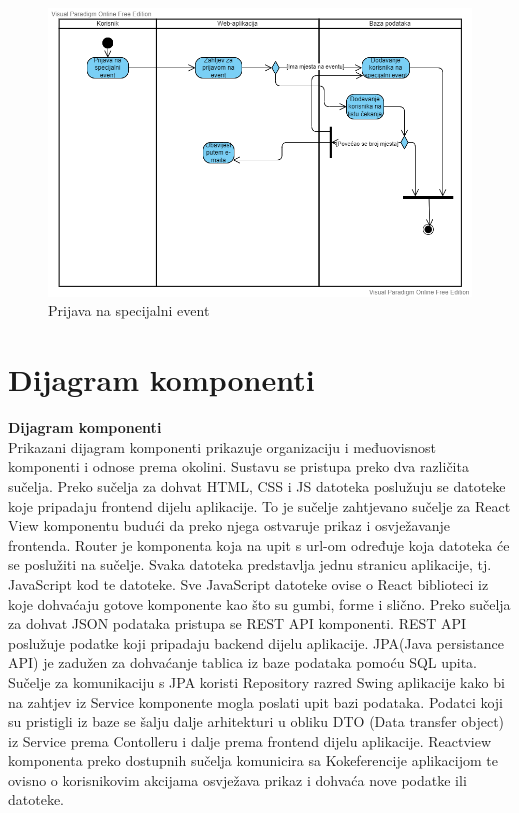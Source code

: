 		   \begin{figure}[H]
		   \includegraphics[scale=0.55]{slike/Prijava na special event.vpd.png} %
		   
		   \centering
		   \caption{Prijava na specijalni event}
		   \label{fig:dijagram_aktivnosti_korisnik}
		   \end{figure}
		   
		   
		   \eject

		\section{Dijagram komponenti}

     \textbf{Dijagram komponenti}\\
				
				{Prikazani dijagram komponenti prikazuje organizaciju i međuovisnost komponenti i odnose prema okolini. Sustavu se pristupa preko dva različita sučelja. Preko sučelja za dohvat HTML, CSS i JS datoteka poslužuju se datoteke koje pripadaju frontend dijelu aplikacije. To je sučelje zahtjevano sučelje za React View komponentu budući da preko njega ostvaruje prikaz i osvježavanje frontenda. Router je komponenta koja na upit s url-om određuje koja datoteka će se poslužiti na sučelje. Svaka datoteka predstavlja jednu stranicu aplikacije, tj. JavaScript kod te datoteke. Sve JavaScript datoteke ovise o React biblioteci iz koje dohvaćaju gotove komponente kao što su gumbi, forme i slično. Preko sučelja za dohvat JSON podataka pristupa se REST API komponenti. REST API poslužuje podatke koji pripadaju backend dijelu aplikacije. JPA(Java persistance API) je zadužen za dohvaćanje tablica iz baze podataka pomoću SQL upita. Sučelje za komunikaciju s JPA koristi Repository razred Swing aplikacije kako bi na zahtjev iz Service komponente mogla poslati upit bazi podataka. Podatci koji su pristigli iz baze se šalju dalje arhitekturi u obliku DTO (Data transfer object) iz Service prema Contolleru i dalje prema frontend dijelu aplikacije. Reactview komponenta preko dostupnih sučelja komunicira sa Kokeferencije aplikacijom te ovisno o korisnikovim akcijama osvježava prikaz i dohvaća nove podatke ili datoteke.}
				
